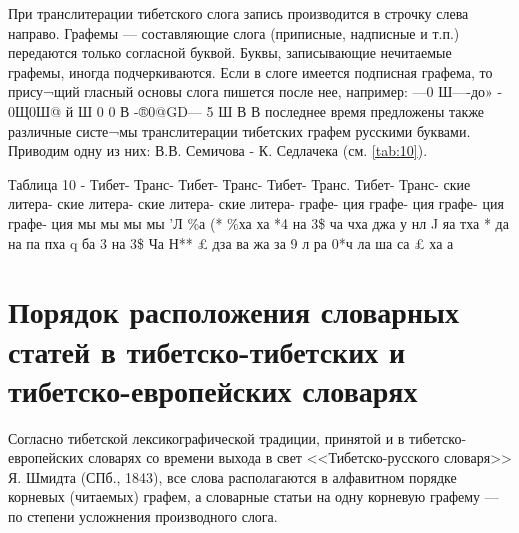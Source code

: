 {При транслитерации тибетского слога запись производится в строчку слева направо.
Графемы --- составляющие слога (приписные, надписные и т.п.) передаются только согласной буквой.
Буквы, записывающие нечитаемые графемы, иногда подчеркиваются.
Если в слоге имеется подписная графема, то прису¬щий гласный основы слога пишется после нее, например:
—0 Ш—-до» - 0Щ0Ш@
й Ш 0 0
В
-®0@GD—
5 Ш
В
В последнее время предложены также различные систе¬мы транслитерации тибетских графем русскими буквами. Приводим одну из них: В.В. Семичова - К. Седлачека (см. \ref{tab:10}).

Таблица 10
		 		 	 	-
Тибет- Транс- Тибет- Транс- Тибет- Транс. Тибет- Транс- ские литера-	ские	литера-	ские	литера-	ские	литера-
графе- ция	графе-	ция	графе-	ция	графе-	ция
мы	мы	мы	мы
’Л \%а	(* \%ха	ха	*4 на
3\$ ча	чха   джа	у	нл
J	яа	тха	* да	 на
 	па	 	пха	q	ба	3	на
3\$ Ча	Н**	£ дза	ва
жа	  за	9	л
 	ра	0*ч	ла	 	ша	 	са
£	ха	а

\section{Порядок расположения словарных статей в тибетско-тибетских и тибетско-европейских словарях}

Согласно тибетской лексикографической традиции, принятой и в тибетско-европейских словарях со времени выхода в свет <<Тибетско-русского словаря>> Я. Шмидта (СПб., 1843), все слова располагаются в алфавитном порядке корневых (читаемых) графем, а словарные статьи на одну корневую графему --- по степени усложнения производного слога.

}
